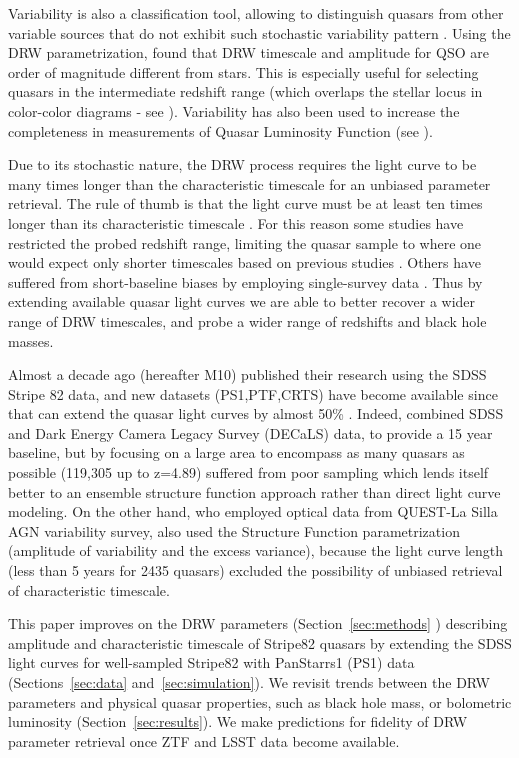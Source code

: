 \documentclass[twocolumn]{aastex62}
\begin{document}
Variability is also a classification tool, allowing to distinguish quasars from other variable sources that do not exhibit such stochastic variability pattern \citep{macleod2011}. Using the DRW parametrization, \citep{macleod2011} found that DRW timescale and amplitude for QSO are order of  magnitude different from stars. This is especially useful for selecting quasars in the intermediate redshift range (which overlaps the stellar locus in color-color diagrams - see \citealt{sesar2007, yang2017}). Variability has also been used to increase the completeness in measurements of Quasar Luminosity Function (see \citealt{ ross2013, palanque2013, alsayyad2016, mcgreer2013, mcgreer2018}). 

Due to its stochastic nature, the DRW process requires the light curve to be many times longer than the characteristic timescale for an unbiased parameter retrieval. The rule of thumb is that the light curve must be at least ten times longer than its characteristic timescale \citep{kozlowski2010, kozlowski2017a}. For this reason some studies have restricted the probed redshift range, limiting the quasar sample to where one would expect only shorter timescales based on previous studies \citep{sun2018, guo2017}. Others have suffered from short-baseline biases by employing single-survey data \citep{hernitschek2016}.
Thus by extending available quasar light curves we are able to better recover a wider range of DRW timescales, and probe a wider range of redshifts and black hole masses. 


Almost a decade ago \citet{macleod2010} (hereafter M10) published their research using the SDSS Stripe 82 data, and new datasets (PS1,PTF,CRTS) have become available since that can extend the quasar light curves by almost 50\% .  Indeed, \citep{li2018} combined SDSS and Dark Energy Camera Legacy Survey (DECaLS) data, to provide a 15 year baseline, but by focusing on a large area to encompass as many quasars as possible (119,305 up to z=4.89) suffered from poor sampling which lends itself better to an ensemble structure function approach rather than direct light curve modeling. On the other hand, \citep{sanchez2018} who employed optical data from QUEST-La Silla AGN variability survey, also used the Structure Function parametrization (amplitude of variability and the excess variance), because the light curve length (less than 5 years for 2435 quasars)  excluded the possibility of unbiased retrieval of characteristic timescale. 


 This paper improves on the DRW parameters (Section~\ref{sec:methods} ) describing amplitude and characteristic timescale of Stripe82 quasars by extending the SDSS light curves for well-sampled Stripe82 with PanStarrs1 (PS1) data (Sections~\ref{sec:data} and~\ref{sec:simulation}). We revisit trends between  the DRW parameters and physical quasar properties, such as black hole mass, or bolometric luminosity (Section~\ref{sec:results}). We make predictions for fidelity of DRW parameter retrieval once ZTF and LSST data become available. 
\end{document}
